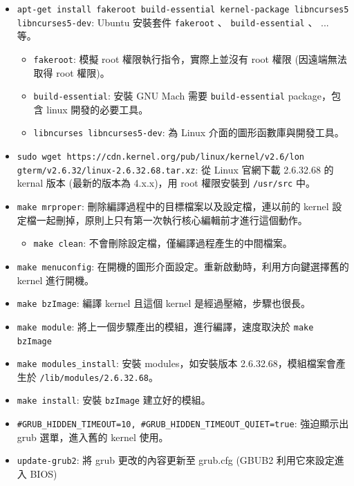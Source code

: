 \documentclass{res}
\begin{document}
\begin{resume}
\begin{itemize}
	\item \lstinline{apt-get install fakeroot build-essential kernel-package libncurses5 libncurses5-dev}: 
	Ubuntu 安裝套件 \lstinline{fakeroot} 、 \lstinline{build-essential} 、 ... 等。
	\begin{itemize}
		\item \lstinline{fakeroot}: 模擬 root 權限執行指令，實際上並沒有 root 權限 (因遠端無法取得 root 權限)。
		\item \lstinline{build-essential}: 安裝 GNU Mach 需要 \lstinline{build-essential} package，包含 linux 開發的必要工具。
		\item \lstinline{libncurses libncurses5-dev}: 為 Linux 介面的圖形函數庫與開發工具。
	\end{itemize}
	\item \lstinline{sudo wget https://cdn.kernel.org/pub/linux/kernel/v2.6/lon gterm/v2.6.32/linux-2.6.32.68.tar.xz}: 從 Linux 官網下載 2.6.32.68 的 kernal 版本 (最新的版本為 4.x.x)，用 root 權限安裝到 \lstinline{/usr/src} 中。
	\item \lstinline{make mrproper}: 刪除編譯過程中的目標檔案以及設定檔，連以前的 kernel 設定檔一起刪掉，原則上只有第一次執行核心編輯前才進行這個動作。
		\begin{itemize}
			\item \lstinline{make clean}: 不會刪除設定檔，僅編譯過程產生的中間檔案。
		\end{itemize}
	\item \lstinline{make menuconfig}: 在開機的圖形介面設定。重新啟動時，利用方向鍵選擇舊的 kernel 進行開機。
	\item \lstinline{make bzImage}: 編譯 kernel 且這個 kernel 是經過壓縮，步驟也很長。
	\item \lstinline{make module}: 將上一個步驟產出的模組，進行編譯，速度取決於 \lstinline{make bzImage}
	\item \lstinline{make modules_install}: 安裝 modules，如安裝版本 2.6.32.68，模組檔案會產生於 \lstinline{/lib/modules/2.6.32.68}。
	\item \lstinline{make install}: 安裝 \lstinline{bzImage} 建立好的模組。
	\item  \lstinline{#GRUB_HIDDEN_TIMEOUT=10, #GRUB_HIDDEN_TIMEOUT_QUIET=true}: 強迫顯示出 grub 選單，進入舊的 kernel 使用。
	\item \lstinline{update-grub2}: 將 grub 更改的內容更新至 grub.cfg (GBUB2 利用它來設定進入 BIOS)
\end{itemize}


\end{resume}
\end{document}
